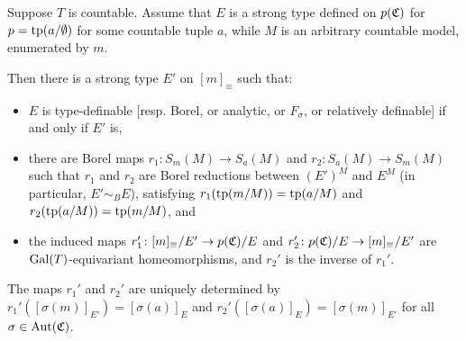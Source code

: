 	\begin{lem}
		\label{lem:every_stype_on_m}
		Suppose $T$ is countable.
		Assume that $E$ is a strong type defined on $p({\mathfrak C})$ for $p=\operatorname{{tp}}(a/\emptyset)$ for some countable tuple $a$, while $M$ is an arbitrary countable model, enumerated by $m$.
		
		Then there is a strong type $E'$ on $[m]_{\equiv}$ such that:
		\begin{itemize}
			\item
			$E$ is type-definable [resp. Borel, or analytic, or $F_\sigma$, or relatively definable] if and only if $E'$ is,
			\item
			there are Borel maps $r_1\colon S_m(M)\to S_a(M)$ and $r_2 \colon S_a(M)\to S_m(M)$ such that $r_1$ and $r_2$ are Borel reductions between $(E')^M$ and $E^M$ (in particular, $E'\sim_B E$), satisfying $r_1(\operatorname{{tp}}(m/M))=\operatorname{{tp}}(a/M)$ and $r_2(\operatorname{{tp}}(a/M))=\operatorname{{tp}}(m/M)$, and
			\item
			the induced maps $r_1'\colon [m]_{\equiv}/E' \to p({\mathfrak C})/E$ and $r_2'\colon p({\mathfrak C})/E \to [m]_{\equiv}/E'$ are $\operatorname{{Gal}}(T)$-equivariant homeomorphisms, and $r_2'$ is the inverse of $r_1'$.
		\end{itemize}
		The maps $r_1'$ and $r_2'$ are uniquely determined by $r_1'([\sigma(m)]_{E'})=[\sigma(a)]_{E}$ and $r_2'([\sigma(a)]_{E})=[\sigma(m)]_{E'}$ for all $\sigma \in \operatorname{{Aut}}({\mathfrak C})$.
	\end{lem}
